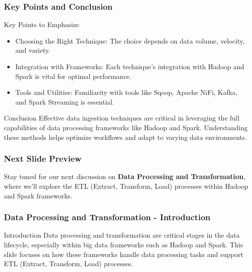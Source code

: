 \documentclass{beamer}
\begin{document}
\begin{frame}[fragile]
    \frametitle{Key Points and Conclusion}
    \begin{block}{Key Points to Emphasize}
        \begin{itemize}
            \item Choosing the Right Technique: The choice depends on data volume, velocity, and variety.
            \item Integration with Frameworks: Each technique's integration with Hadoop and Spark is vital for optimal performance.
            \item Tools and Utilities: Familiarity with tools like Sqoop, Apache NiFi, Kafka, and Spark Streaming is essential.
        \end{itemize}
    \end{block}
    
    \begin{block}{Conclusion}
        Effective data ingestion techniques are critical in leveraging the full capabilities of data processing frameworks like Hadoop and Spark. Understanding these methods helps optimize workflows and adapt to varying data environments.
    \end{block}
\end{frame}

\begin{frame}[fragile]
    \frametitle{Next Slide Preview}
    Stay tuned for our next discussion on \textbf{Data Processing and Transformation}, where we'll explore the ETL (Extract, Transform, Load) processes within Hadoop and Spark frameworks.
\end{frame}

\begin{frame}[fragile]
    \frametitle{Data Processing and Transformation - Introduction}
    \begin{block}{Introduction}
        Data processing and transformation are critical stages in the data lifecycle, especially within big data frameworks such as Hadoop and Spark. This slide focuses on how these frameworks handle data processing tasks and support ETL (Extract, Transform, Load) processes.
    \end{block}
\end{frame}
\end{document}

